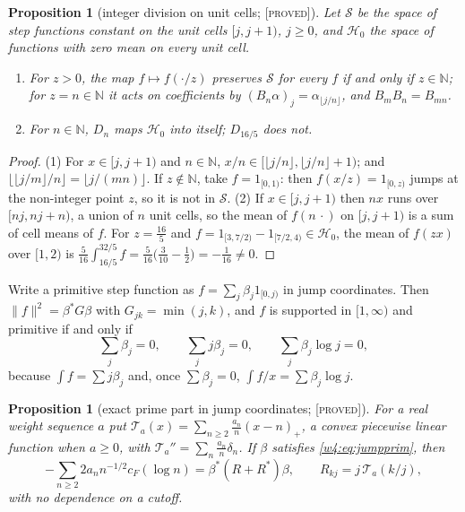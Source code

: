\documentclass[11pt]{amsart}
\newtheorem{proposition}[theorem]{Proposition}
\theoremstyle{definition}
\theoremstyle{remark}
\numberwithin{equation}{section}
\newcommand{\N}{\mathbb{N}}
\newcommand{\cF}{c_F}                                  %
\newcommand{\stag}[1]{\textsc{[#1]}}
\newcommand{\PROVED}{\stag{proved}}
\begin{document}
\begin{proposition}[integer division on unit cells; \PROVED]\label{w4:prop:cells}
Let $\mathcal S$ be the space of step functions constant on the unit cells $[j,j+1)$, $j\ge0$, and $\mathcal H_0$ the space of functions
with zero mean on every unit cell.
\begin{enumerate}
\item For $z>0$, the map $f\mapsto f(\cdot/z)$ preserves $\mathcal S$ for every $f$ if and only if $z\in\N$; for $z=n\in\N$ it acts on
coefficients by $(B_n\alpha)_j=\alpha_{\lfloor j/n\rfloor}$, and $B_mB_n=B_{mn}$.
\item For $n\in\N$, $D_n$ maps $\mathcal H_0$ into itself; $D_{16/5}$ does not.
\end{enumerate}
\end{proposition}

\begin{proof}
(1) For $x\in[j,j+1)$ and $n\in\N$, $x/n\in[\lfloor j/n\rfloor,\lfloor j/n\rfloor+1)$; and $\lfloor\lfloor j/m\rfloor/n\rfloor=\lfloor j/(mn)\rfloor$.
If $z\notin\N$, take $f=1_{[0,1)}$: then $f(x/z)=1_{[0,z)}$ jumps at the non-integer point $z$, so it is not in $\mathcal S$.
(2) If $x\in[j,j+1)$ then $nx$ runs over $[nj,nj+n)$, a union of $n$ unit cells, so the mean of $f(n\,\cdot)$ on $[j,j+1)$ is a sum of cell means of $f$.
For $z=\frac{16}5$ and $f=1_{[3,7/2)}-1_{[7/2,4)}\in\mathcal H_0$, the mean of $f(zx)$ over $[1,2)$ is $\frac5{16}\int_{16/5}^{32/5}f=\frac5{16}\big(\tfrac3{10}-\tfrac12\big)=-\tfrac1{16}\ne0$.
\end{proof}

Write a primitive step function as $f=\sum_j\beta_j1_{[0,j)}$ in jump coordinates. Then $\|f\|^2=\beta^*G\beta$ with $G_{jk}=\min(j,k)$, and
$f$ is supported in $[1,\infty)$ and primitive if and only if
\begin{equation}\label{w4:eq:jumpprim}
\textstyle\sum_j\beta_j=0,\qquad\sum_jj\beta_j=0,\qquad\sum_j\beta_j\log j=0,
\end{equation}
because $\int f=\sum j\beta_j$ and, once $\sum\beta_j=0$, $\int f/x=\sum\beta_j\log j$.

\begin{proposition}[exact prime part in jump coordinates; \PROVED]\label{w4:prop:jump}
For a real weight sequence $a$ put $\mathcal T_a(x)=\sum_{n\ge2}\frac{a_n}n(x-n)_+$, a convex piecewise linear function when $a\ge0$, with
$\mathcal T_a''=\sum_n\frac{a_n}n\delta_n$. If $\beta$ satisfies \eqref{w4:eq:jumpprim}, then
\[
-\sum_{n\ge2}2a_nn^{-1/2}\cF(\log n)=\beta^*(R+R^*)\beta,\qquad R_{kj}=j\,\mathcal T_a(k/j),
\]
with no dependence on a cutoff.
\end{proposition}
\end{document}
